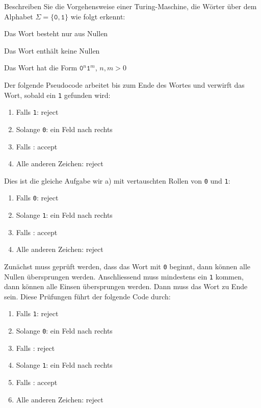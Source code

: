 Beschreiben Sie die Vorgehensweise einer Turing-Maschine, die Wörter
über dem Alphabet $\Sigma=\{\texttt{0},\texttt{1}\}$ wie folgt erkennt:
\begin{teilaufgaben}
\item Das Wort besteht nur aus Nullen
\item Das Wort enthält keine Nullen
\item Das Wort hat die Form $\texttt{0}^n\texttt{1}^m$, $n,m>0$
\end{teilaufgaben}


\begin{loesung}
\begin{teilaufgaben}
\item 
Der folgende Pseudocode arbeitet bis zum Ende des Wortes und verwirft
das Wort, sobald ein \texttt{1} gefunden wird:
\begin{enumerate}[1.]
\item Falls \texttt{1}: {\color{darkred}reject}
\item Solange \texttt{0}: ein Feld nach rechts
\item Falls \blank: {\color{darkgreen}accept}
\item Alle anderen Zeichen: {\color{darkred}reject}
\end{enumerate}
\item 
Dies ist die gleiche Aufgabe wir a) mit vertauschten Rollen von
\texttt{0} und \texttt{1}:
\begin{enumerate}[1.]
\item Falls \texttt{0}: {\color{darkred}reject}
\item Solange \texttt{1}: ein Feld nach rechts
\item Falls \blank: {\color{darkgreen}accept}
\item Alle anderen Zeichen: {\color{darkred}reject}
\end{enumerate}
\item
Zunächst muss geprüft werden, dass das Wort mit \texttt{0} beginnt,
dann können alle Nullen übersprungen werden.
Anschliessend muss mindestens ein \texttt{1} kommen, dann können alle
Einsen übersprungen werden.
Dann muss das Wort zu Ende sein.
Diese Prüfungen führt der folgende Code durch:
\begin{enumerate}[1.]
\item Falls \texttt{1}: {\color{darkred}reject}
\item Solange \texttt{0}: ein Feld nach rechts
\item Falls \blank: {\color{darkred}reject}
\item Solange \texttt{1}: ein Feld nach rechts
\item Falls \blank: {\color{darkgreen}accept}
\item Alle anderen Zeichen: {\color{darkred}reject}
\end{enumerate}
\end{teilaufgaben}
\end{loesung}
